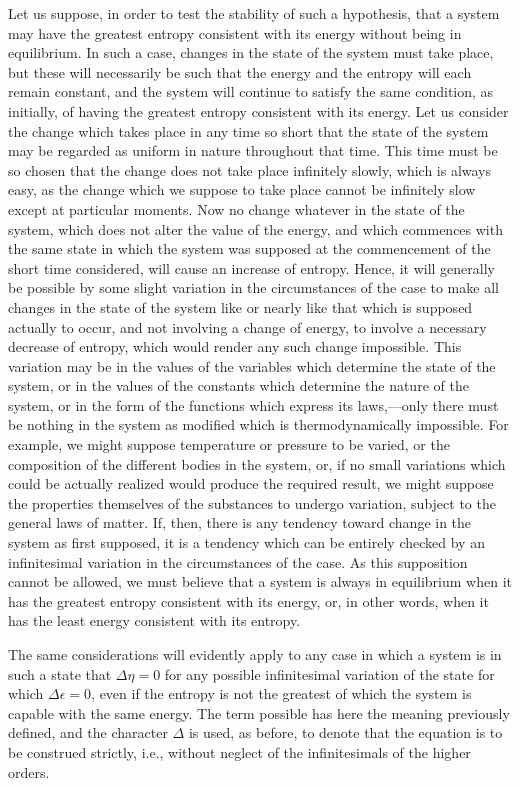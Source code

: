 \documentclass[11pt]{article}
\newcommand{\eps}{\epsilon}
\newcommand{\D}{\Delta}
\begin{document}
Let us suppose, in order to test the stability of such a hypothesis, that a system may have the greatest entropy consistent with its energy without being in equilibrium. In such a case, changes in the state of the system must take place, but these will necessarily be such that the energy and the entropy will each remain constant, and the system will continue to satisfy the same condition, as initially, of having the greatest entropy consistent with its energy. Let us consider the change which takes place in any time so short that the state of the system may be regarded as uniform in nature throughout that time. This time must be so chosen that the change does not take place infinitely slowly, which is always easy, as the change which we suppose to take place cannot be infinitely slow except at particular moments. Now no change whatever in the state of the system, which does not alter the value of the energy, and which commences with the same state in which the system was supposed at the commencement of the short time considered, will cause an increase of entropy. Hence, it will generally be possible by some slight variation in the circumstances of the case to make all changes in the state of the system like or nearly like that which is supposed actually to occur, and not involving a change of energy, to involve a necessary decrease of entropy, which would render any such change impossible. This variation may be in the values of the variables which determine the state of the system, or in the values of the constants which determine the nature of the system, or in the form of the functions which express its laws,—only there must be nothing in the system as modified which is thermodynamically impossible. For example, we might suppose temperature or pressure to be varied, or the composition of the different bodies in the system, or, if no small variations which could be actually realized would produce the required result, we might suppose the properties themselves of the substances to undergo variation, subject to the general laws of matter. If, then, there is any tendency toward change in the system as first supposed, it is a tendency which can be entirely checked by an infinitesimal variation in the circumstances of the case. As this supposition cannot be allowed, we must believe that a system is always in equilibrium when it has the greatest entropy consistent with its energy, or, in other words, when it has the least energy consistent with its entropy.

The same considerations will evidently apply to any case in which a system is in such a state that \(\D\eta=0\) for any possible infinitesimal variation of the state for which \(\D\eps=0\), even if the entropy is not the greatest of which the system is capable with the same energy. The term possible has here the meaning previously defined, and the character \(\D\) is used, as before, to denote that the equation is to be construed strictly, i.e., without neglect of the infinitesimals of the higher orders.
\end{document}
